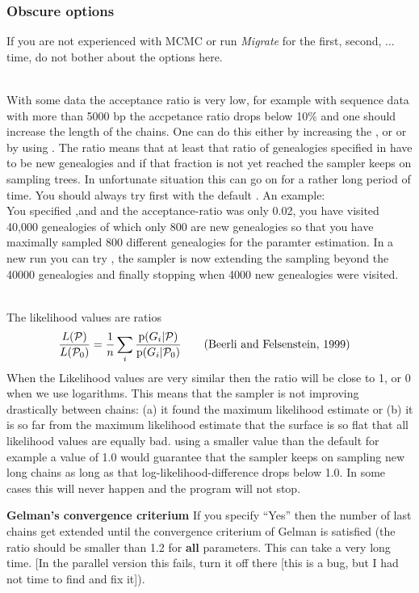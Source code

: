 \subsubsection{Obscure options}
If you are not experienced with MCMC or run {\it Migrate} for the first, 
second, ... time, do not bother about the options here.
\begin{description}
\item{}\\
With some data the acceptance ratio is very low, for example with 
sequence data with more than 5000 bp the accpetance ratio drops below 10\%
and one should increase the length of the chains. One can do this either by increasing the {}, or {} or by using
{}. The ratio means that at least that ratio of genealogies
specified in {} have to be  new genealogies and if that fraction
is not yet reached the sampler keeps on sampling trees. In unfortunate situation this can go on for a rather long period of time.
You should always try first with the default {}.
An example:\\
You specified {},and {} and the acceptance-ratio was only 0.02, you have visited 40,000 genealogies of which only 800 are new genealogies so that you have maximally sampled 800 different
genealogies for the paramter estimation.
In a new run you can try {}, the sampler is now extending the sampling beyond the 40000 genealogies and finally stopping when 4000 new genealogies were visited.

\item{}\\
The likelihood values are ratios
\begin{align}
\frac{L(\mathcal{P})}{L(\mathcal{P}_0)}&=\frac{1}{n} \sum_i\frac{{\rm p}(G_i | \mathcal{P})} {{\rm p}(G_i | \mathcal{P}_0)}\qquad\text{(Beerli and Felsenstein, 1999)}\nonumber
\end{align}
When the Likelihood values are very similar then the ratio will be close
to 1, or 0 when we use logarithms. This means that the sampler
is not improving drastically between chains: (a) it found the maximum likelihood estimate or (b) it is so far from the maximum likelihood estimate that the surface is so flat that all likelihood values are equally bad.
using a smaller value than the default {}
for example a value of 1.0 would guarantee that the sampler keeps on 
sampling new long chains as long as that log-likelihood-difference drops below 1.0. In some cases this will never happen and the program will not stop.
\item{ \bf Gelman's convergence criterium} If you specify ``Yes'' then 
the number of last chains get extended until the convergence criterium
of Gelman is satisfied (the ratio should be smaller than 1.2 for {\bf all} parameters. This can take a very long time. [In the parallel version this fails, turn it off there [this is a bug, but I had not time to find and fix it]).
\end{description}

